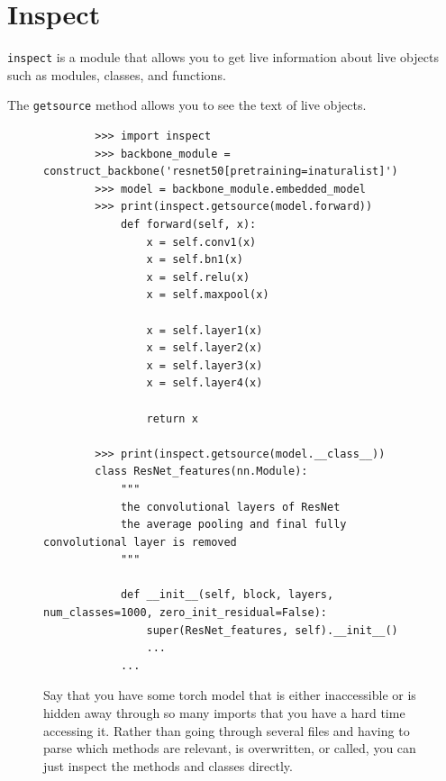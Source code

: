 \section{Inspect} 

  \texttt{inspect} is a module that allows you to get live information about live objects such as modules, classes, and functions. 

  
  \begin{definition}
    \label{def:getsource}
    The \texttt{getsource} method allows you to see the text of live objects. 

    \begin{figure}[H]
      \centering 
      \begin{lstlisting}
        >>> import inspect 
        >>> backbone_module = construct_backbone('resnet50[pretraining=inaturalist]')
        >>> model = backbone_module.embedded_model 
        >>> print(inspect.getsource(model.forward))
            def forward(self, x):
                x = self.conv1(x)
                x = self.bn1(x)
                x = self.relu(x)
                x = self.maxpool(x)

                x = self.layer1(x)
                x = self.layer2(x)
                x = self.layer3(x)
                x = self.layer4(x)

                return x

        >>> print(inspect.getsource(model.__class__))
        class ResNet_features(nn.Module):
            """
            the convolutional layers of ResNet
            the average pooling and final fully convolutional layer is removed
            """

            def __init__(self, block, layers, num_classes=1000, zero_init_residual=False):
                super(ResNet_features, self).__init__()
                ...
            ...
      \end{lstlisting}
      \caption{Say that you have some torch model that is either inaccessible or is hidden away through so many imports that you have a hard time accessing it. Rather than going through several files and having to parse which methods are relevant, is overwritten, or called, you can just inspect the methods and classes directly.}
    \end{figure}
  \end{definition}
